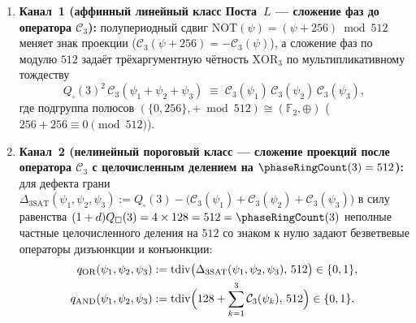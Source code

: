 \begin{enumerate}[leftmargin=*,noitemsep]
\item \textbf{Канал~1 (аффинный линейный класс Поста~$L$ --- сложение фаз до оператора $\mathcal{C}_3$):}
  полупериодный сдвиг $\mathrm{NOT}(\psi) = (\psi + 256) \bmod 512$ меняет знак проекции ($\mathcal{C}_3(\psi + 256) = -\mathcal{C}_3(\psi)$), а сложение фаз по модулю $512$ задаёт трёхаргументную чётность $\mathrm{XOR}_3$ по мультипликативному тождеству
  \begin{equation}
    \label{eq:mono-pre-rotator-xor}
    Q_\square(3)^2\,\mathcal{C}_3(\psi_1 + \psi_2 + \psi_3) \;\equiv\; \mathcal{C}_3(\psi_1)\,\mathcal{C}_3(\psi_2)\,\mathcal{C}_3(\psi_3),
  \end{equation}
  где подгруппа полюсов $(\{0, 256\}, + \bmod 512) \cong (\mathbb{F}_2, \oplus)$ ($256 + 256 \equiv 0 \pmod{512}$).
\item \textbf{Канал~2 (нелинейный пороговый класс --- сложение проекций после оператора $\mathcal{C}_3$ с целочисленным делением на $\phaseRingCount(3) = 512$):}
  для дефекта грани $\Delta_{\mathrm{3SAT}}(\psi_1, \psi_2, \psi_3) := Q_\square(3) - \bigl(\mathcal{C}_3(\psi_1) + \mathcal{C}_3(\psi_2) + \mathcal{C}_3(\psi_3)\bigr)$ в силу равенства $(1 + d)Q_\square(3) = 4 \times 128 = 512 = \phaseRingCount(3)$ неполные частные целочисленного деления на $512$ со знаком к нулю задают безветвевые операторы дизъюнкции и конъюнкции:
  \begin{align}
    q_{\mathrm{OR}}(\psi_1, \psi_2, \psi_3) &:= \mathrm{tdiv}\bigl(\Delta_{\mathrm{3SAT}}(\psi_1, \psi_2, \psi_3),\,512\bigr) \in \{0, 1\}, \label{eq:mono-post-rotator-or-and} \\
    q_{\mathrm{AND}}(\psi_1, \psi_2, \psi_3) &:= \mathrm{tdiv}\Bigl(128 + \sum_{k=1}^3 \mathcal{C}_3(\psi_k),\,512\Bigr) \in \{0, 1\}. \label{eq:mono-post-rotator-and}
  \end{align}
\end{enumerate}

